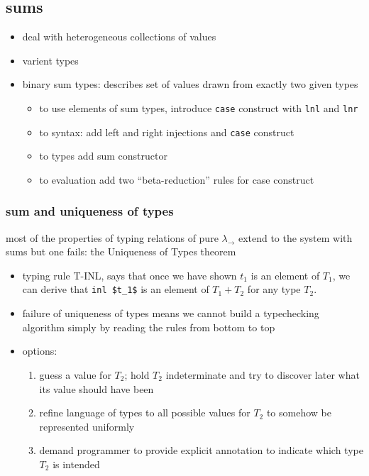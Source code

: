 \documentclass[11pt]{article}
\begin{document}
\subsection{sums}
\label{sec:org3bca674}
\begin{itemize}
\item deal with heterogeneous collections of values
\item varient types
\item binary sum types: describes set of values drawn from exactly two given types
\begin{itemize}
\item to use elements of sum types, introduce \texttt{case} construct with \texttt{lnl} and \texttt{lnr}
\item to syntax: add left and right injections and \texttt{case} construct
\item to types add sum constructor
\item to evaluation add two ``beta-reduction'' rules for case construct
\end{itemize}
\end{itemize}

\subsubsection{sum and uniqueness of types}
\label{sec:org2a24e66}
most of the properties of typing relations of pure \(\lambda_{\rightarrow}\) extend to the system with sums but one fails: the Uniqueness of Types theorem
\begin{itemize}
\item typing rule T-INL, says that once we have shown \(t_1\) is an element of \(T_1\), we can derive that \texttt{inl \$t\_1\$} is an element of \(T_1+T_2\) for any type \(T_2\).
\item failure of uniqueness of types means we cannot build a typechecking algorithm simply by reading the rules from bottom to top
\item options:
\begin{enumerate}
\item guess a value for \(T_2\); hold \(T_2\) indeterminate and try to discover later what its value should have been
\item refine language of types to all possible values for \(T_2\) to somehow be represented uniformly
\item demand programmer to provide explicit annotation to indicate which type \(T_2\) is intended
\end{enumerate}
\end{itemize}
\end{document}
